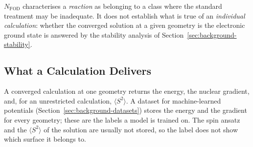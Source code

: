 $N_\text{FOD}$ characterises a \emph{reaction} as belonging to a class where the
standard treatment may be inadequate. It does not establish what is true of an
\emph{individual calculation}: whether the converged solution at a given geometry
is the electronic ground state is answered by the stability analysis of
Section~\ref{sec:background-stability}.


\subsection{What a Calculation Delivers}
\label{sec:background-labels}

A converged calculation at one geometry returns the energy, the nuclear
gradient, and, for an unrestricted calculation, $\langle S^2 \rangle$. A
dataset for machine-learned potentials (Section~\ref{sec:background-datasets})
stores the energy and the gradient for every geometry; these are the labels a
model is trained on. The spin ansatz and the $\langle S^2 \rangle$ of the
solution are usually not stored, so the label does not show which surface it
belongs to.
